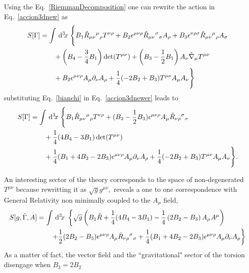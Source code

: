 \documentclass[%
  showpacs,showkeys,prd,superscriptaddress]{revtex4-1}
\def\l{\left}
\def\r{\right}
\begin{document}
Using the  Eq.~\eqref{RiemmanDecomposition}  one can rewrite the action in Eq.~\eqref{accion3dnew} as
\begin{align}
  \label{accion3dnewer}
  \begin{split}
    S[\Gamma]
    &= \int\dn{3}{x} \Bigg\{ B_1\hat R_{\mu\nu}{}^\mu{}_{\rho} T^{\nu\rho}+B_2\epsilon^{\mu\nu\rho}\hat R_{\mu\nu}{}^{\sigma}{}_\sigma A_\rho+B_3\epsilon^{\nu\rho\sigma}\hat R_{\mu\nu}{}^{\mu}{}_\rho A_\sigma \\ 
    & \qquad +\l(B_4-\frac{3}{4}B_1\r) \det(T^{\mu\nu}) + \l(B_3-\frac{1}{2}B_1\r) A_\nu\hat\nabla_\mu T^{\mu\nu}\\ 
    & \qquad + B_2\epsilon^{\mu\nu\rho}A_\mu\partial_\nu A_\rho+\frac{1}{4}(-2B_2+B_3)T^{\mu\nu}A_\mu A_\nu\Bigg\}
  \end{split}
\end{align}
substituting Eq.~\eqref{bianchi} in Eq.~\eqref{accion3dnewer}  leads to
\begin{align}
  \label{accion3dfinal}
  \begin{split}
    S[\Gamma]&=\int\,{\mathrm{d}}^{3}\!{x}\; \Bigg\{B_1\hat R_{\mu\nu}{}^\mu{}_{\rho} T^{\nu\rho}+(B_2-\frac{1}{2}B_3)\epsilon^{\mu\nu\rho}A_\mu\hat R_{\nu\rho}{}^{\sigma}{}_\sigma \\
    & \qquad + \frac{1}{4}(4B_4-3B_1) \det(T^{\mu\nu})\\
    & \qquad + \frac{1}{4}(B_1+4B_2-2B_3)\epsilon^{\mu\nu\rho}A_\mu\partial_\nu A_\rho+\frac{1}{4}(-2B_2+B_3)T^{\mu\nu}A_\mu A_\nu\Bigg\}.
  \end{split}
\end{align}

An interesting sector of the theory corresponds to the space of non-degenerated $T^{\mu\nu}$ because rewritting it as $\sqrt{g}g^{\mu\nu},$ reveals a one to one correspondence with General Relativity non minimally coupled to the $A_\mu$ field,
\begin{align}
  \label{accion3dGR}
  \begin{split}
    S[g,\hat\Gamma,A]&=
    \int\dn{3}{x} \l\{\sqrt{g}\l(B_1\hat R +\frac{1}{4}(4B_4-3B_1) -\frac{1}{4}\l( 2B_2-B_3\r) A_\mu A^\mu\r)\r.\\
    & \qquad \l.+\frac{1}{2}(2B_2-B_3)\epsilon^{\mu\nu\rho}A_\mu\hat R_{\nu\rho}{}^{\sigma}{}_\sigma+\frac{1}{4}(B_1+4B_2-2B_3)\epsilon^{\mu\nu\rho}A_\mu\partial_\nu A_\rho\r\}
  \end{split}
\end{align}
As a matter of fact, the vector field and the ``gravitational" sector of the torsion disengage when $B_3=2B_2$
\end{document}
